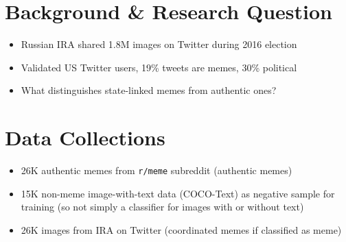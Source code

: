 \documentclass[article,36pt,extrafontsizes,oneside,openany,oldfontcommands]{memoir}
\begin{document}
\begin{adjmulticols*}{3}{0.5in}{0.5in}
\color{bodytextcol}

\section{Background \& Research Question}

\begin{adjustwidth}{0in}{0in}
\begin{itemize}[topsep=0pt,itemsep=0ex,partopsep=0ex,parsep=0ex]
\item Russian IRA shared 1.8M images on Twitter during 2016 election
\item Validated US Twitter users, 19\% tweets are memes, 30\% political
\item What distinguishes state-linked memes from authentic ones?
\end{itemize}
\end{adjustwidth}


\section{Data Collections}

\begin{adjustwidth}{0in}{0in}
\begin{itemize}[topsep=0pt,itemsep=0ex,partopsep=0ex,parsep=0ex]
\item 26K authentic memes from \texttt{r/meme} subreddit (authentic memes)
\item 15K non-meme image-with-text data (COCO-Text) as negative sample for training (so not simply a classifier for images with or without text)
\item 26K images from IRA on Twitter (coordinated memes if classified as meme)
\end{itemize} 
\end{adjustwidth}



\end{adjmulticols*}
\end{document}
